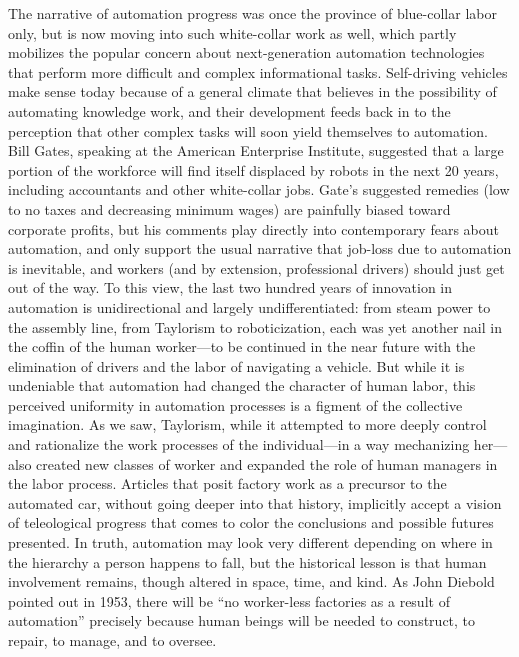 The narrative of automation progress was once the province of
blue-collar labor only, but is now moving into such white-collar work as
well, which partly mobilizes the popular concern about next-generation
automation technologies that perform more difficult and complex
informational tasks. Self-driving vehicles make sense today because of
a general climate that believes in the possibility of automating
knowledge work, and their development feeds back in to the perception
that other complex tasks will soon yield themselves to automation. Bill
Gates, speaking at the American Enterprise Institute,
suggested that a large portion of the workforce will find itself
displaced by robots in the next 20 years, including accountants and
other white-collar
jobs.\cite{gatesRobots}
Gate's suggested remedies (low to no taxes and decreasing minimum
wages) are painfully biased toward corporate profits, but his comments play directly into
contemporary fears about automation, and only support the usual
narrative that job-loss due to automation is inevitable, and workers
(and by extension, professional drivers)
should just get out of the way. To this view, the last two hundred
years of innovation in automation is unidirectional and largely
undifferentiated:  from steam power to the assembly line, from
Taylorism to roboticization, each was yet another nail in the coffin
of the human worker---to be continued in the near future with the
elimination of drivers and the labor of navigating a vehicle. But
while it is undeniable that automation had changed the
character of human labor, this perceived uniformity in automation
processes is a figment of the collective imagination. As we saw,
Taylorism, while it attempted to more deeply control and rationalize
the work processes of the individual---in a way mechanizing her---also
created new classes of worker and expanded the role of human managers
in the labor process. Articles that posit factory work as a precursor to the automated
car, without going deeper into that history, implicitly accept a
vision of teleological progress that comes to color the conclusions
and possible futures presented. In truth, automation may look very
different depending on where in the hierarchy 
a person happens to fall, but the historical lesson is that human
involvement remains, though altered in space, time, and kind. As John
Diebold pointed out in 1953, there will be ``no worker-less
factories as a result of automation''\cite[p. 63-64]{dieboldNew}
precisely because human beings will be needed to construct, to repair,
to manage, and to oversee.

